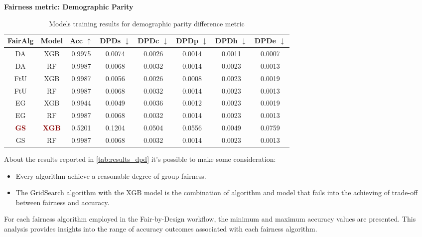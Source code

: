 \textbf{Fairness metric: Demographic Parity}

\begin{table}
    \centering
    \begin{tabular}{|c|c|c|c|c|c|c|c|}
        \hline
        \textbf{FairAlg} & \textbf{Model} & \textbf{Acc} $\uparrow$ & \textbf{DPDs} $\downarrow$ & \textbf{DPDc} $\downarrow$ & \textbf{DPDp} $\downarrow$ & \textbf{DPDh} $\downarrow$ & \textbf{DPDe} $\downarrow$ \\
        \hline
        DA & XGB & 0.9975 & 0.0074 & 0.0026 & 0.0014 & 0.0011 & 0.0007\\
        \hline
        DA & RF & 0.9987 & 0.0068 & 0.0032 & 0.0014 & 0.0023 & 0.0013\\
        \hline
        FtU & XGB & 0.9987 & 0.0056 & 0.0026 & 0.0008 & 0.0023 & 0.0019 \\
        \hline
        FtU & RF & 0.9987 & 0.0068 & 0.0032 & 0.0014 & 0.0023 & 0.0013 \\
        \hline
        EG & XGB & 0.9944 & 0.0049 & 0.0036 & 0.0012 & 0.0023 & 0.0019 \\
        \hline
        EG & RF & 0.9987 & 0.0068 & 0.0032 & 0.0014 & 0.0023 & 0.0013 \\
        \hline
        \textcolor{darkred}{\textbf{GS}} & \textcolor{darkred}{\textbf{XGB}} & 0.5201 & 0.1204 & 0.0504 & 0.0556 & 0.0049 & 0.0759 \\
        \hline
        GS & RF & 0.9987 & 0.0068 & 0.0032 & 0.0014 & 0.0023 & 0.0013 \\
        \hline
    \end{tabular}
    \caption{Models training results for demographic parity difference metric}
    \label{fig:results_dpd}
\end{table}

About the results reported in \cref{tab:results_dpd} it's possible to make some consideration:

\begin{itemize}
        \item Every algorithm achieve a reasonable degree of group fairness.

        \item The GridSearch algorithm with the XGB model is the combination of algorithm and model that fails into the achieving of trade-off between fairness and accuracy.

\end{itemize}

For each fairness algorithm employed in the Fair-by-Design workflow, the minimum and maximum accuracy values are presented. This analysis provides insights into the range of accuracy outcomes associated with each fairness algorithm.

